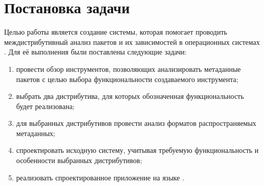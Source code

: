
\section{Постановка задачи}
\label{sec:task}
Целью работы является создание системы, которая помогает проводить междистрибутивный анализ пакетов и их зависимостей в операционных системах {\linux}.
Для её выполнения были поставлены следующие задачи:
\begin{enumerate}
	\item провести обзор инструментов, позволяющих анализировать метаданные пакетов с целью выбора функциональности создаваемого инструмента;
	\item выбрать два дистрибутива, для которых обозначенная функциональность будет реализована;
	\item для выбранных дистрибутивов провести анализ форматов распространяемых метаданных;
	\item спроектировать исходную систему, учитывая требуемую функциональность и особенности выбранных дистрибутивов;
	\item реализовать спроектированное приложение на языке {\python}.
\end{enumerate}
